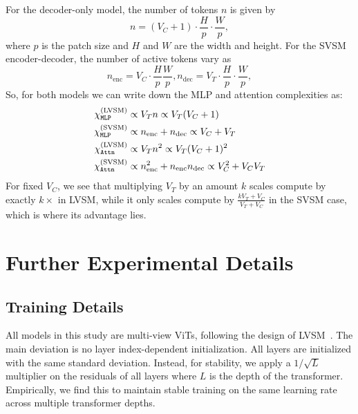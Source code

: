 For the decoder-only model, the number of tokens $n$ is given by
\begin{equation}
    n = (V_C + 1) \cdot \frac{H}{p} \cdot \frac{W}{p},
\end{equation}
where $p$ is the patch size and $H$ and $W$ are the width and height. For the SVSM encoder-decoder, the number of active tokens vary as 
\begin{equation}
    n_{\text{enc}} = V_C \cdot \frac{H}{p} \frac Wp, n_{\text{dec}} = V_T \cdot \frac Hp \cdot \frac Wp,
\end{equation}
So, for both models we can write down the MLP and attention complexities as:
\begin{align}
    \chi_{\mathtt{MLP}}^{(\text{LVSM})} &\propto V_T n \propto V_T (V_C + 1) \\
    \chi_{\mathtt{MLP}}^{(\text{SVSM})} &\propto n_{\text{enc}} + n_{\text{dec}} \propto V_C + V_T \\
    \chi_{\mathtt{Attn}}^{(\text{LVSM})} &\propto V_T n^2 \propto V_T (V_C + 1)^2 \\
    \chi_{\mathtt{Attn}}^{(\text{SVSM})} &\propto n_{\text{enc}}^2 + n_{\text{enc}}n_{\text{dec}} \propto V_C^2 + V_CV_T
\end{align}
For fixed $V_C$, we see that multiplying $V_T$ by an amount $k$ scales compute by exactly $k\times$ in LVSM, while it only scales compute by $\frac{kV_T + V_C}{V_T + V_C}$ in the SVSM case, which is where its advantage lies.





\section{Further Experimental Details}
\label{supp:exp-details}

\subsection{Training Details}

All models in this study are multi-view ViTs, following the design of LVSM~\citep{jin2024lvsm}. The main deviation is no layer index-dependent initialization. All layers are initialized with the same standard deviation. Instead, for stability, we apply a $1/\sqrt{L}$ multiplier on the residuals of all layers where $L$ is the depth of the transformer. Empirically, we find this to maintain stable training on the same learning rate across multiple transformer depths. 

